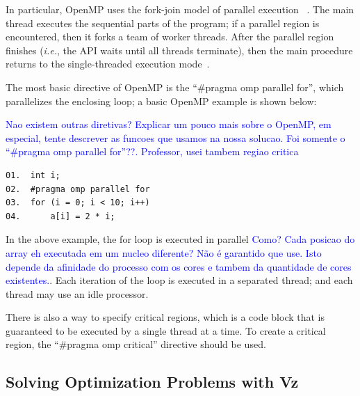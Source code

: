 In particular, OpenMP uses the fork-join model of parallel execution ~\cite{OpenMP1998}. The main thread executes the sequential parts of the program; if a parallel region is encountered, then it forks a team of worker threads. After the parallel region finishes ({\it i.e.}, the API waits until all threads terminate), then the main procedure returns to the single-threaded execution mode~\cite{Wu2014}.

The most basic directive of OpenMP is the ``\#pragma omp parallel for'', which parallelizes the enclosing loop; a basic OpenMP example is shown below:

\textcolor{blue}{Nao existem outras diretivas? Explicar um pouco mais sobre o OpenMP, em especial, tente descrever as funcoes que usamos na nossa solucao. Foi somente o ``\#pragma omp parallel for''??. Professor, usei tambem regiao critica}

\begin{lstlisting}[caption=OpenMP basic sample]
01.  int i;
02.  #pragma omp parallel for
03.  for (i = 0; i < 10; i++)
04.      a[i] = 2 * i;
\end{lstlisting}

In the above example, the for loop is executed in parallel \textcolor{blue}{Como? Cada posicao do array eh executada em um nucleo diferente? Não é garantido que use. Isto depende da afinidade do processo com os cores e tambem da quantidade de cores existentes.}. Each iteration of the loop is executed in a separated thread; and each thread may use an idle processor.

There is also a way to specify critical regions, which is a code block that is guaranteed to be executed by a single thread at a time. To create a critical region, the ``\#pragma omp critical'' directive should be used.
\subsection{Solving Optimization Problems with Vz}
\label{Optimization-with-Vz}

